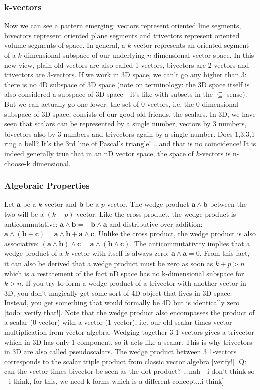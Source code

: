 \subsubsection{k-vectors}
Now we can see a pattern emerging: vectors represent oriented line segments, bivectors represent oriented plane segments and trivectors represent oriented volume segments of space. In general, a $k$-vector represents an oriented segment of a $k$-dimensional subspace of our underlying $n$-dimensional vector space. In this new view, plain old vectors are also called 1-vectors, bivectors are 2-vectors and trivectors are 3-vectors. If we work in 3D space, we can't go any higher than 3: there is no 4D subspace of 3D space (note on terminology: the 3D space itself is also considered a subspace of 3D space - it's like with subsets in the $\subseteq$ sense). But we can actually go one lower: the set of 0-vectors, i.e. the 0-dimensional subspace of 3D space, consists of our good old friends, the scalars. In 3D, we have seen that scalars can be represented by a single number, vectors by 3 numbers, bivectors also by 3 numbers and trivectors again by a single number. Does 1,3,3,1 ring a bell? It's the 3rd line of Pascal's triangle! ...and that is no coincidence! It is indeed generally true that in an nD vector space, the space of $k$-vectors is n-choose-k dimensional.

\subsubsection{Algebraic Properties}
Let $\mathbf{a}$ be a $k$-vector and $\mathbf{b}$ be a $p$-vector. The wedge product $\mathbf{a \wedge b}$ between the two will be a $(k+p)$-vector. Like the cross product, the wedge product is anticommutative: $\mathbf{a \wedge b} = -\mathbf{b \wedge a}$ and distributive over addition: $\mathbf{a \wedge (b + c) = a \wedge b + a \wedge c }$. Unlike the cross product, the wedge product is also associative: $\mathbf{(a \wedge b) \wedge c = a \wedge (b \wedge c)}$. The anticommutativity implies that a wedge product of a $k$-vector with itself is always zero: $\mathbf{a \wedge a} = 0$. From this fact, it can also be derived that a wedge product must be zero as soon as $k+p > n$ which is a restatement of the fact nD space has no k-dimensional subspace for $k>n$. If you try to form a wedge product of a trivector with another vector in 3D, you don't magically get some sort of 4D object that lives in 3D space. Instead, you get something that would formally be 4D but is identically zero [todo: verify that!]. Note that the wedge product also encompasses the product of a scalar (0-vector) with a vector (1-vector), i.e. our old scalar-times-vector multiplication from vector algebra. Wedging together 3 1-vectors gives a trivector which in 3D has only 1 component, so it acts like a scalar. This is why trivectors in 3D are also called pseudoscalars. The wedge product between 3 1-vectors corresponds to the scalar triple product from classic vector algebra [verify!] [Q: can the vector-times-bivector be seen as the dot-product? ...nah - i don't think so - i think, for this, we need k-forms which is a different concept...i think]


